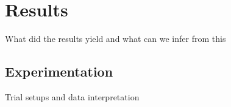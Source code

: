 

\chapter{Results}
What did the results yield and what can we infer from this

\section{Experimentation}
Trial setups and data interpretation
